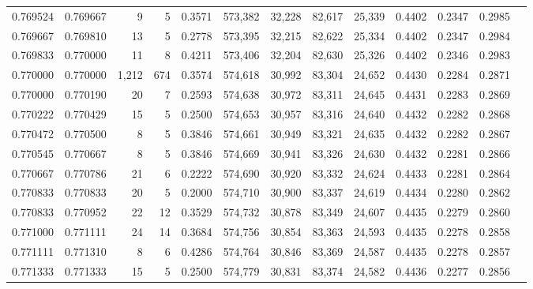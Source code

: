 \begin{tabular}{rrrrrrrrrrrrr}
0.769524 & 0.769667 &     9 &   5 &                                     0.3571 & 573,382 &  32,228 &  82,617 &  25,339 & 0.4402 & 0.2347 & 0.2985 \\
0.769667 & 0.769810 &    13 &   5 &                                     0.2778 & 573,395 &  32,215 &  82,622 &  25,334 & 0.4402 & 0.2347 & 0.2984 \\
0.769833 & 0.770000 &    11 &   8 &                                     0.4211 & 573,406 &  32,204 &  82,630 &  25,326 & 0.4402 & 0.2346 & 0.2983 \\
0.770000 & 0.770000 & 1,212 & 674 &                                     0.3574 & 574,618 &  30,992 &  83,304 &  24,652 & 0.4430 & 0.2284 & 0.2871 \\
0.770000 & 0.770190 &    20 &   7 &                                     0.2593 & 574,638 &  30,972 &  83,311 &  24,645 & 0.4431 & 0.2283 & 0.2869 \\
0.770222 & 0.770429 &    15 &   5 &                                     0.2500 & 574,653 &  30,957 &  83,316 &  24,640 & 0.4432 & 0.2282 & 0.2868 \\
0.770472 & 0.770500 &     8 &   5 &                                     0.3846 & 574,661 &  30,949 &  83,321 &  24,635 & 0.4432 & 0.2282 & 0.2867 \\
0.770545 & 0.770667 &     8 &   5 &                                     0.3846 & 574,669 &  30,941 &  83,326 &  24,630 & 0.4432 & 0.2281 & 0.2866 \\
0.770667 & 0.770786 &    21 &   6 &                                     0.2222 & 574,690 &  30,920 &  83,332 &  24,624 & 0.4433 & 0.2281 & 0.2864 \\
0.770833 & 0.770833 &    20 &   5 &                                     0.2000 & 574,710 &  30,900 &  83,337 &  24,619 & 0.4434 & 0.2280 & 0.2862 \\
0.770833 & 0.770952 &    22 &  12 &                                     0.3529 & 574,732 &  30,878 &  83,349 &  24,607 & 0.4435 & 0.2279 & 0.2860 \\
0.771000 & 0.771111 &    24 &  14 &                                     0.3684 & 574,756 &  30,854 &  83,363 &  24,593 & 0.4435 & 0.2278 & 0.2858 \\
0.771111 & 0.771310 &     8 &   6 &                                     0.4286 & 574,764 &  30,846 &  83,369 &  24,587 & 0.4435 & 0.2278 & 0.2857 \\
0.771333 & 0.771333 &    15 &   5 &                                     0.2500 & 574,779 &  30,831 &  83,374 &  24,582 & 0.4436 & 0.2277 & 0.2856 \\

\end{tabular}
